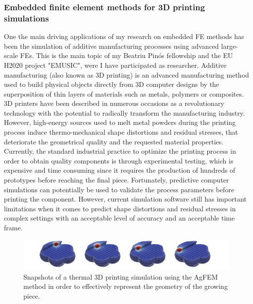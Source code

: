 \documentclass{article}
\begin{document}
\subsubsection{Embedded finite element methods for 3D printing simulations}

One the main driving applications of my research on embedded FE methods has been {{the simulation of additive manufacturing processes using advanced large-scale FEs}}. This is the main topic of my Beatriu Pinós fellowship and the {{EU H2020 project "EMUSIC"}}, were I have participated as researcher. Additive manufacturing (also known as 3D printing) is an advanced manufacturing method used to build physical objects directly from 3D computer designs by the superposition of thin layers of materials such as metals, polymers or composites. 3D printers have been described in numerous occasions as a revolutionary technology with the potential to radically transform the manufacturing industry. However, high-energy sources used to melt metal powders during the printing process induce thermo-mechanical shape distortions and residual stresses, that deteriorate the geometrical quality and the requested material properties. Currently, the standard industrial practice  to optimize the printing process in order to obtain quality components is through experimental testing, which is expensive and time consuming since it requires the production of hundreds of prototypes before reaching the final piece. Fortunately, predictive computer simulations can potentially be used to validate the process parameters before printing the component. However, current simulation software still has important limitations when it comes to predict shape distortions and residual stresses in complex settings with an acceptable level of accuracy and an acceptable time frame. 

\begin{figure}[ht!]
\includegraphics[width=\textwidth]{../_assets/fig6.png}
\caption{Snapshots of a thermal 3D printing simulation using the AgFEM method in order to effectively represent the geometry of the growing piece.}
\label{fig:AM-AggFEM}
\end{figure}
\end{document}
